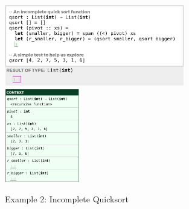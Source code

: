 
\begin{figure}[t]
\includegraphics[width=0.7\textwidth,interpolate=false,valign=t]{images/qsort-code.png}
\includegraphics[width=0.29\textwidth,interpolate=false,valign=t]{images/qsort-sidebar-1.png}
\caption{Example 2: Incomplete Quicksort}
\label{fig:qsort-cell-mockup}
\vspace{-6px}
\end{figure}



